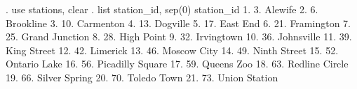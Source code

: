 . use stations, clear
{\smallskip}
. list station_id, sep(0)
{\smallskip}
     {\TLC}
     {\VBAR}           station_id {\VBAR}
     {\LFTT}
  1. {\VBAR}           3. Alewife {\VBAR}
  2. {\VBAR}         6. Brookline {\VBAR}
  3. {\VBAR}        10. Carmenton {\VBAR}
  4. {\VBAR}         13. Dogville {\VBAR}
  5. {\VBAR}         17. East End {\VBAR}
  6. {\VBAR}       21. Framington {\VBAR}
  7. {\VBAR}   25. Grand Junction {\VBAR}
  8. {\VBAR}       28. High Point {\VBAR}
  9. {\VBAR}       32. Irvingtown {\VBAR}
 10. {\VBAR}       36. Johnsville {\VBAR}
 11. {\VBAR}      39. King Street {\VBAR}
 12. {\VBAR}         42. Limerick {\VBAR}
 13. {\VBAR}      46. Moscow City {\VBAR}
 14. {\VBAR}     49. Ninth Street {\VBAR}
 15. {\VBAR}     52. Ontario Lake {\VBAR}
 16. {\VBAR} 56. Picadilly Square {\VBAR}
 17. {\VBAR}       59. Queens Zoo {\VBAR}
 18. {\VBAR}   63. Redline Circle {\VBAR}
 19. {\VBAR}    66. Silver Spring {\VBAR}
 20. {\VBAR}      70. Toledo Town {\VBAR}
 21. {\VBAR}    73. Union Station {\VBAR}
     {\BLC}
